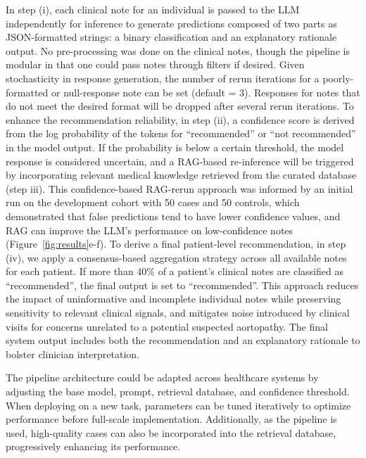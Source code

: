 \documentclass[fleqn,10pt]{wlscirep}
\begin{document}




In step (i), each clinical note for an individual is passed to the LLM independently for inference to generate predictions composed of two parts as JSON-formatted strings: a binary classification and an explanatory rationale output. No pre-processing was done on the clinical notes, though the pipeline is modular in that one could pass notes through filters if desired. Given stochasticity in response generation, the number of rerun iterations for a poorly-formatted or null-response note can be set (default = 3). Responses for notes that do not meet the desired format will be dropped after several rerun iterations. To enhance the recommendation reliability, in step (ii), a confidence score is derived from the log probability of the tokens for “recommended” or “not recommended” in the model output. If the probability is below a certain threshold, the model response is considered uncertain, and a RAG-based re-inference will be triggered by incorporating relevant medical knowledge retrieved from the curated database (step iii). This confidence-based RAG-rerun approach was informed by an initial run on the development cohort with 50 cases and 50 controls, which demonstrated that false predictions tend to have lower confidence values, and RAG can improve the LLM’s performance on low-confidence notes (Figure~\ref{fig:results}e-f). To derive a final patient-level recommendation, in step (iv), we apply a consensus-based aggregation strategy across all available notes for each patient. If more than 40\% of a patient’s clinical notes are classified as ``recommended'', the final output is set to ``recommended''. This approach reduces the impact of uninformative and incomplete individual notes while preserving sensitivity to relevant clinical signals, and mitigates noise introduced by clinical visits for concerns unrelated to a potential suspected aortopathy. The final system output includes both the recommendation and an explanatory rationale to bolster clinician interpretation.

The pipeline architecture could be adapted across healthcare systems by adjusting the base model, prompt, retrieval database, and confidence threshold. When deploying on a new task, parameters can be tuned iteratively to optimize performance before full-scale implementation. Additionally, as the pipeline is used, high-quality cases can also be incorporated into the retrieval database, progressively enhancing its performance.
\end{document}
